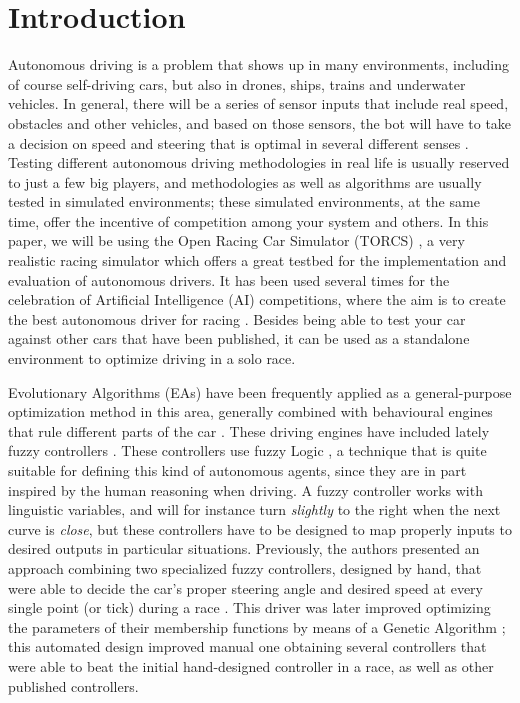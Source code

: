 \documentclass[conference]{IEEEtran}
\begin{document}
\section{Introduction}
\label{sec:intro}

Autonomous driving is a problem that shows up in many environments,
including of course self-driving cars, but also in drones, ships,
trains and underwater vehicles. In general, there will be a series of
sensor inputs that include real speed, obstacles and other vehicles,
and based on those sensors, the bot will have to take a decision on
speed and steering that is optimal in several different
senses \cite{Autodriv2006}. Testing different autonomous driving methodologies in real life is usually reserved to just a few big players, and methodologies
as well as algorithms are usually tested in simulated environments;
these simulated environments, at the same time, offer the incentive of
competition among your system and others. In this paper, we will be
using the Open Racing Car Simulator (TORCS) \cite{WebTORCS}, a very
realistic racing simulator which offers a great testbed for the
implementation and evaluation of autonomous drivers.  
It has been used several times for the celebration of Artificial
Intelligence (AI) competitions, where the aim is to create the best
autonomous driver for racing
\cite{SimulatedCarRacing-2008,SimulatedCarRacing2009,CarRacingCompetition_SoftwareManual13}. Besides being able to test your car against other cars that have been published, it can be used as a standalone environment to optimize driving in a solo race. 

Evolutionary Algorithms (EAs) \cite{EAs_Back96} have been frequently
applied as a general-purpose optimization method in this area,
generally combined with behavioural engines that rule different parts
of the car
\cite{Floreano2004,CarRacing_Pelta09,SAES2012,AutopiaDriver2012}. These
driving engines have included lately fuzzy controllers
\cite{Guadarrama2008, LFAG, PerezEvolvingFuzzy09}. These controllers
use fuzzy Logic \cite{Fuzzy2011}, a  technique that is quite suitable
for defining this kind of autonomous agents, since they are in part
inspired by the human reasoning when driving. A fuzzy controller works
with linguistic variables, and will for instance turn {\em slightly}
to the right when the next curve is {\em close}, but these controllers
have to be designed to map properly inputs to desired outputs in
particular situations. Previously, the authors presented an approach
combining two specialized fuzzy controllers, designed by hand, that
were able to decide the car's proper steering angle and desired speed
at every single point (or tick) during a race \cite{evo17}. This
driver was later improved \cite{evo18} optimizing the parameters of
their membership functions by means of a Genetic Algorithm
\cite{GAs_Goldberg89}; this automated design improved manual one
obtaining several controllers that were able to beat the initial
hand-designed controller in a race, as well as other published
controllers. 
\end{document}
